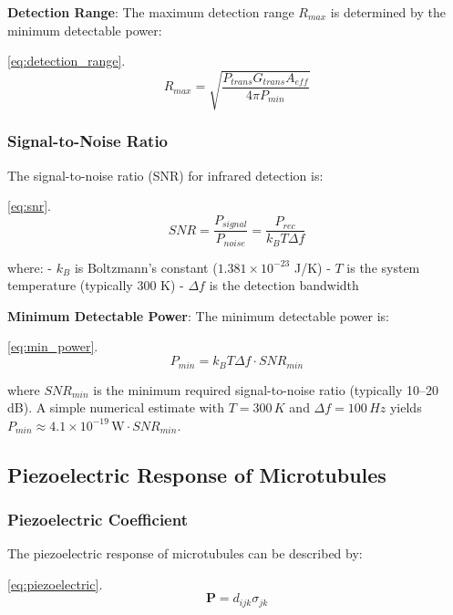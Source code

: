 \documentclass[
  13pt,
  a4paperpaper,
  12pt]{article}
\begin{document}
\textbf{Detection Range}: The maximum detection range \(R_{max}\) is
determined by the minimum detectable power:

\eqref{eq:detection_range}. \begin{equation}
R_{max} = \sqrt{\frac{P_{trans} G_{trans} A_{eff}}{4\pi P_{min}}} \label{eq:detection_range}
\end{equation}

\subsubsection{Signal-to-Noise Ratio}\label{signal-to-noise-ratio}

The signal-to-noise ratio (SNR) for infrared detection is:

\eqref{eq:snr}. \begin{equation}
SNR = \frac{P_{signal}}{P_{noise}} = \frac{P_{rec}}{k_B T \Delta f} \label{eq:snr}
\end{equation}

where: - \(k_B\) is Boltzmann's constant (\(1.381 \times 10^{-23}\) J/K)
- \(T\) is the system temperature (typically 300 K) - \(\Delta f\) is
the detection bandwidth

\textbf{Minimum Detectable Power}: The minimum detectable power is:

\eqref{eq:min_power}. \begin{equation}
P_{min} = k_B T \Delta f \cdot SNR_{min} \label{eq:min_power}
\end{equation}

where \(SNR_{min}\) is the minimum required signal-to-noise ratio
(typically 10--20 dB). A simple numerical estimate with \(T=300\,K\) and
\(\Delta f=100\,Hz\) yields
\(P_{min}\approx4.1\times10^{-19}\,\text{W}\cdot SNR_{min}\).

\subsection{Piezoelectric Response of
Microtubules}\label{piezoelectric-response-of-microtubules}

\subsubsection{Piezoelectric
Coefficient}\label{piezoelectric-coefficient}

The piezoelectric response of microtubules can be described by:

\eqref{eq:piezoelectric}. \begin{equation}
\mathbf{P} = d_{ijk} \sigma_{jk} \label{eq:piezoelectric}
\end{equation}
\end{document}
